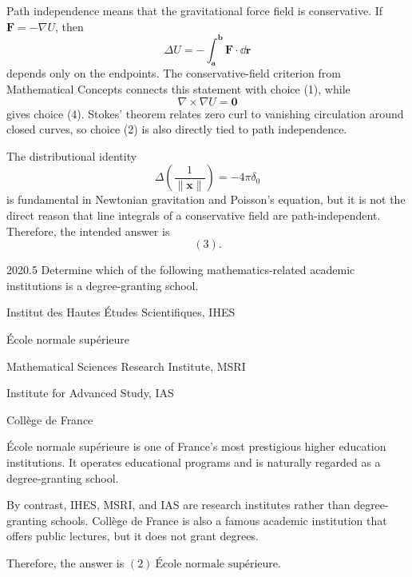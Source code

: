     \begin{solution}
        Path independence means that the gravitational force field is
        conservative. If $\mathbf{F}=-\nabla U$, then
        \[
            \Delta U
            =
            -\int_{\mathbf{a}}^{\mathbf{b}}\mathbf{F}\cdot\dd\mathbf{r}
        \]
        depends only on the endpoints. The conservative-field criterion from
        Mathematical Concepts connects this statement with choice (1), while
        \[
            \nabla\times\nabla U=\mathbf{0}
        \]
        gives choice (4). Stokes' theorem relates zero curl to vanishing
        circulation around closed curves, so choice (2) is also directly tied
        to path independence.

        The distributional identity
        \[
            \Delta\left(\frac{1}{\lVert\mathbf{x}\rVert}\right)
            =
            -4\pi\delta_0
        \]
        is fundamental in Newtonian gravitation and Poisson's equation, but it
        is not the direct reason that line integrals of a conservative field are
        path-independent. Therefore, the intended answer is
        \[
            \boxed{(3)}.
        \]
    \end{solution}

    \begin{pastproblem}{2020.5}
        Determine which of the following mathematics-related academic institutions is a
        degree-granting school.
        \begin{problemchoices}
            \item Institut des Hautes Études Scientifiques, IHES
            \item École normale supérieure
            \item Mathematical Sciences Research Institute, MSRI
            \item Institute for Advanced Study, IAS
            \item Collège de France
        \end{problemchoices}
    \end{pastproblem}

    \begin{solution}
        École normale supérieure is one of France's most prestigious higher education
        institutions. It operates educational programs and is naturally regarded as a
        degree-granting school.

        By contrast, IHES, MSRI, and IAS are research institutes rather than degree-granting
        schools. Collège de France is also a famous academic institution that offers public
        lectures, but it does not grant degrees.

        Therefore, the answer is $\boxed{(2)\ \text{École normale supérieure}}$.
    \end{solution}

